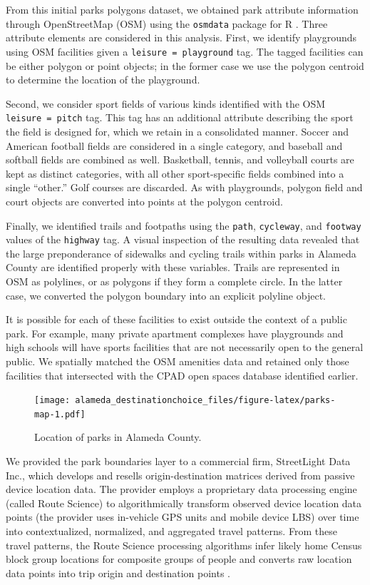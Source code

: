 \documentclass[3p, authoryear, review]{elsarticle} %
\begin{document}
From this initial parks polygons dataset, we obtained park attribute information through OpenStreetMap (OSM) using the \texttt{osmdata} package for R \citep{osmdata}. Three attribute elements are considered in this analysis. First, we identify playgrounds using OSM facilities given a \texttt{leisure\ =\ playground} tag. The tagged facilities can be either polygon or point objects; in the former case we use the polygon centroid to determine the location of the playground.

Second, we consider sport fields of various kinds identified with the OSM
\texttt{leisure\ =\ pitch} tag. This tag has an additional attribute describing the sport the field is designed for, which we retain in a consolidated manner. Soccer and American football fields are considered in a single category, and baseball and softball fields are combined as well. Basketball, tennis, and volleyball courts are kept as distinct categories, with all other sport-specific fields combined into a single ``other.'' Golf courses are discarded. As with playgrounds, polygon field and court objects are converted into points at the polygon centroid.

Finally, we identified trails and footpaths using the \texttt{path}, \texttt{cycleway}, and \texttt{footway} values of the \texttt{highway} tag. A visual inspection of the resulting data revealed that the large preponderance of sidewalks and cycling trails within parks in Alameda County are identified properly with these variables. Trails are represented in OSM as polylines, or as polygons if they form a complete circle. In the latter case, we converted the polygon boundary into an explicit polyline object.

It is possible for each of these facilities to exist outside the context of a public park. For example, many private apartment complexes have playgrounds and high schools will have sports facilities that are not necessarily open to the general public. We spatially matched the OSM amenities data and retained only those facilities that intersected with the CPAD open spaces database identified earlier.

\begin{figure}
\centering
\texttt{[image: alameda\_destinationchoice\_files/figure-latex/parks-map-1.pdf]}
\caption{\label{fig:parks-map}Location of parks in Alameda County.}
\end{figure}

We provided the park boundaries layer to a commercial firm, StreetLight Data Inc., which develops and resells origin-destination matrices derived from passive device location data. The provider employs a proprietary data processing engine (called Route Science) to algorithmically transform observed device location data points (the provider uses in-vehicle GPS units and mobile device LBS) over time into contextualized, normalized, and aggregated travel patterns. From these travel patterns, the Route Science processing algorithms infer likely home Census block group locations for composite groups of people and converts raw location data points into trip origin and destination points \citep{Pan2006, Friedrich2010}.
\end{document}
